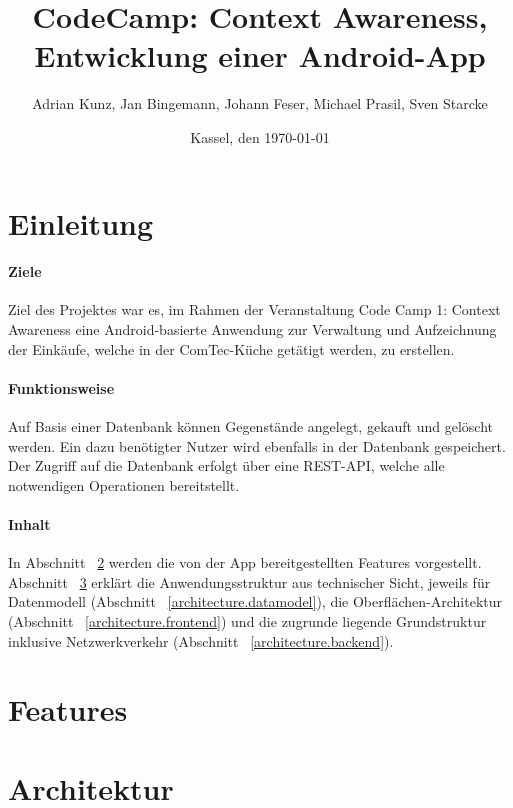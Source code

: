 \documentclass{scrartcl}
\begin{document}
	\title{CodeCamp: Context Awareness, Entwicklung einer Android-App}
	\author{Adrian Kunz, Jan Bingemann, Johann Feser, Michael Prasil, Sven Starcke}
	\date{Kassel, den \today}
	
	\maketitle
	\newpage
	
	\tableofcontents
	\newpage
	
	\section{Einleitung}
		\paragraph*{Ziele}
		Ziel des Projektes war es, im Rahmen der Veranstaltung \glqq Code Camp 1: Context Awareness\grqq{} eine Android-basierte Anwendung zur Verwaltung und Aufzeichnung der Einkäufe, welche in der ComTec-Küche getätigt werden, zu erstellen.
		
		\paragraph*{Funktionsweise}
		Auf Basis einer Datenbank können Gegenstände angelegt, gekauft und gelöscht werden. Ein dazu benötigter Nutzer wird ebenfalls in der Datenbank gespeichert. Der Zugriff auf die Datenbank erfolgt über eine REST-API, welche alle notwendigen Operationen bereitstellt.
		
		\paragraph*{Inhalt}
		In Abschnitt ~\ref{features} werden die von der App bereitgestellten Features vorgestellt. Abschnitt ~\ref{architecture} erklärt die Anwendungsstruktur aus technischer Sicht, jeweils für Datenmodell (Abschnitt ~\ref{architecture.datamodel}), die Oberflächen-Architektur (Abschnitt ~\ref{architecture.frontend}) und die zugrunde liegende Grundstruktur inklusive Netzwerkverkehr (Abschnitt ~\ref{architecture.backend}).
		
	\section{Features} \label{features}
	
	\section{Architektur} \label{architecture}
\end{document}
